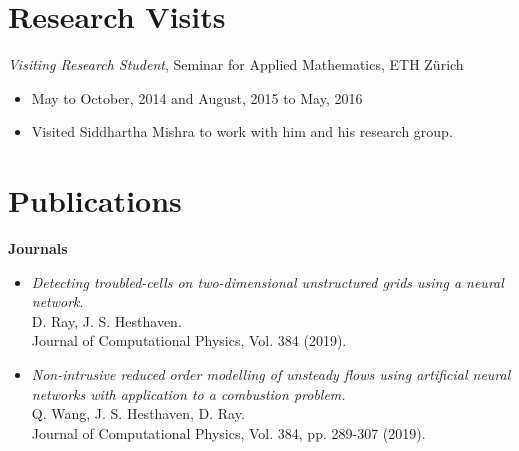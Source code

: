 \documentclass[margin]{res}
\begin{document}
\begin{resume}
% 

\section{Research Visits}
 {\it Visiting Research Student}, Seminar for Applied Mathematics, ETH Z\"{u}rich
 \begin{itemize} \itemsep -2pt  %
 \item May to October, 2014 and August, 2015 to May, 2016            
 \item Visited Siddhartha Mishra to work with him and his research group.
 \end{itemize}
 
 \newpage

 \section{Publications}

\textbf{Journals}                
            \begin{itemize}  
            
             \item {\it Detecting troubled-cells on two-dimensional unstructured grids using a neural network}. \\
             D. Ray, J. S. Hesthaven. \\
             Journal of Computational Physics, Vol. 384 (2019).      
            
            \item {\it Non-intrusive reduced order modelling of unsteady flows using artificial neural networks with application to a combustion problem.} \\
              Q. Wang, J. S. Hesthaven, D. Ray.\\
              Journal of Computational Physics, Vol. 384, pp. 289-307 (2019).
            

\end{itemize}
\end{resume}
\end{document}
